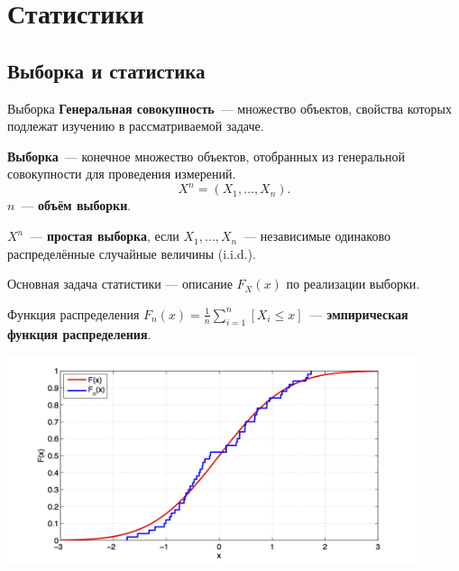 \documentclass[9pt,pdf,utf8,hyperref={unicode},aspectratio=169]{beamer}
\begin{document}
\section{Статистики}
\subsection{Выборка и статистика}
\begin{frame}{Выборка}
% 
    \textbf{Генеральная совокупность}~--- множество объектов, свойства которых подлежат изучению в рассматриваемой задаче.

    \bigskip

    \textbf{Выборка}~--- конечное множество объектов, отобранных из генеральной совокупности для проведения измерений.
    $$X^n=\left(X_1,\dots,X_n\right).$$
    $n$~--- \textbf{объём выборки}.

    \bigskip

    $X^n$~--- \textbf{простая выборка}, если $X_1,\dots,X_n$~--- независимые одинаково распределённые случайные величины (i.i.d.).

    \bigskip

    Основная задача статистики --- описание $F_X(x)$ по реализации выборки.
\end{frame}

\begin{frame}{Функция распределения}
    $F_n\left(x\right) = \frac1{n} \sum\limits_{i=1}^n \left[X_i\leq x\right]$~--- \textbf{эмпирическая функция распределения}.
    \begin{center}
   		\includegraphics[width=0.9\textwidth]{ecdf.png}
    \end{center}
\end{frame}
\end{document}

